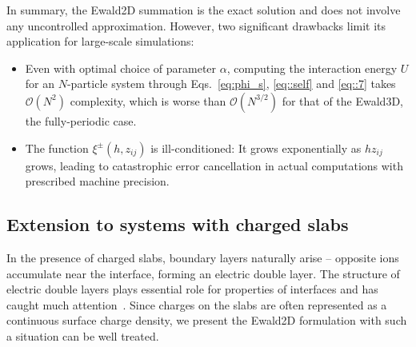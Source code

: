 In summary, the Ewald2D summation is the exact solution and does not involve any uncontrolled approximation. 
However, two significant drawbacks limit its application for large-scale simulations:
\begin{itemize}
	\item Even with optimal choice of parameter $\alpha$, computing the interaction energy $U$ for an $N$-particle system through Eqs.~\eqref{eq:phi_s}, \eqref{eq::self} and \eqref{eq::7} takes $\mathcal O(N^2)$ complexity, which is worse than $\mathcal O(N^{3/2})$ for that of the Ewald3D, the fully-periodic case.
	\item The function $\xi^{\pm}(h, z_{ij})$ is ill-conditioned: It grows exponentially as $h z_{ij}$ grows, leading to catastrophic error cancellation in actual computations with prescribed machine precision.
\end{itemize}

\subsection{Extension to systems with charged slabs}\label{sec::sysslabs}

In the presence of charged slabs, boundary layers naturally arise -- opposite ions accumulate near the interface, forming an electric double layer. The structure of electric double layers plays essential role for properties of interfaces and has caught much attention~\cite{messina2004effect,breitsprecher2014coarse,moreira2002simulations}. Since charges on the slabs are often represented as a continuous surface charge density, we present the Ewald2D formulation with such a situation can be well treated.


